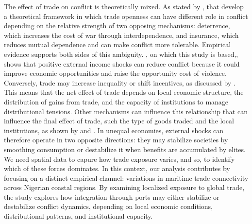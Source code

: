 The effect of trade on conflict is theoretically mixed. As stated by \textcite{martin2008civil}, that develop a theoretical framework in which trade openness can have different role in conflict depending on the relative strength of two opposing mechanisms: deterrence, which increases the cost of war through interdependence, and insurance, which reduces mutual dependence and can make conflict more tolerable. Empirical evidence supports both sides of this ambiguity. \textcite{berman2015external}, on which this study is based,, shows that positive external income shocks can reduce conflict because it could improve economic opportunities and raise the opportunity cost of violence. 
Conversely, trade may increase inequality or shift incentives, as discussed by \textcite{amodio2024trade}. This means that the net effect of trade depends on local economic structure, the distribution of gains from trade, and the capacity of institutions to manage distributional tensions.
Other mechanisms can influence this relationship that can influence the final effect of trade, such the type of goods traded and the local institutions, as shown by \textcite{dube2013commodity} and \textcite{berman2017mine}.
In unequal economies, external shocks can therefore operate in two opposite directions: they may stabilize societies by smoothing consumption or destabilize it when benefits are accumulated by elites. We need spatial data to capure how trade exposure varies, and so, to identify  which of these forces dominates. In this context, our analysis contributes by focusing on a distinct empirical channel: variations in maritime trade connectivity across Nigerian coastal regions. By examining localized exposure to global trade, the study explores how integration through ports may either stabilize or destabilize conflict dynamics, depending on local economic conditions, distributional patterns, and institutional capacity.\\

